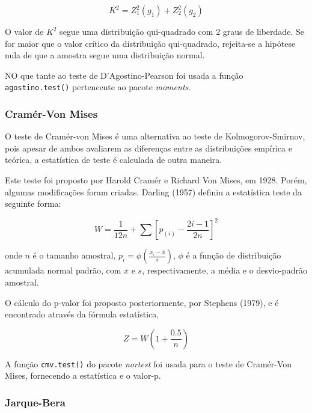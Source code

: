 \documentclass[a4paper,11pt]{article} %
\begin{document}
\begin{equation}
    K^{2} = Z_{1}^{2}(g_{1}) + Z_{2}^{2}(g_{2})
\end{equation}

O valor de $K^{2}$ segue uma distribuição qui-quadrado com 2 graus de liberdade. Se for maior que o valor crítico da distribuição qui-quadrado, rejeita-se a hipótese nula de que a amostra segue uma distribuição normal.\vskip0.3cm

NO que tante ao teste de D’Agostino-Pearson foi usada a função \texttt{agostino.test()} pertencente ao pacote \textit{moments}.\vskip0.3cm


\subsubsection{Cramér-Von Mises}

O teste de Cramér-von Mises é uma alternativa ao teste de Kolmogorov-Smirnov, pois
apesar de ambos avaliarem as diferenças entre as distribuições empírica e teórica, a estatística de teste é calculada de outra maneira.\vskip0.3cm

Este teste foi proposto por Harold Cramér e Richard Von Mises, em 1928. Porém, algumas modificações foram criadas. Darling (1957) definiu a estatística teste da seguinte forma:

\begin{equation}
    W = \frac{1}{12n} + \sum \left[ p_{(i)} - \frac{2i-1}{2n} \right]^{2}
\end{equation}

onde $n$ é o tamanho amostral, $p_{i} = \phi \left(  \frac{x_{i}-\bar{x}}{s} \right)$, $\phi$ é a função de distribuição acumulada normal padrão, com $\bar{x}$ e $s$, respectivamente, a média e o desvio-padrão amostral.\vskip0.3cm

O cálculo do p-valor foi proposto posteriormente, por Stephens (1979), e é encontrado através da fórmula estatística,

\begin{equation}
    Z = W \left(1 + \frac{0.5}{n} \right)
\end{equation}

A função \texttt{cmv.test()} do pacote \textit{nortest} foi usada para o teste de Cramér-Von Mises, fornecendo a estatística e o valor-p.\vskip0.3cm

\subsubsection{Jarque-Bera}
\end{document}
